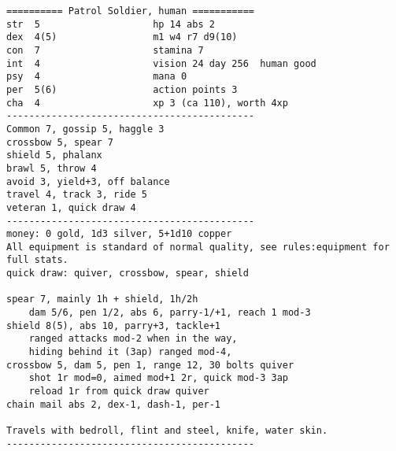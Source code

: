\goodbreak \begin{samepage} \small \begin{verbatim}
========== Patrol Soldier, human ===========
str  5                    hp 14 abs 2
dex  4(5)                 m1 w4 r7 d9(10)
con  7                    stamina 7
int  4                    vision 24 day 256  human good
psy  4                    mana 0
per  5(6)                 action points 3
cha  4                    xp 3 (ca 110), worth 4xp
--------------------------------------------
Common 7, gossip 5, haggle 3
crossbow 5, spear 7
shield 5, phalanx
brawl 5, throw 4
avoid 3, yield+3, off balance
travel 4, track 3, ride 5
veteran 1, quick draw 4
--------------------------------------------
money: 0 gold, 1d3 silver, 5+1d10 copper
All equipment is standard of normal quality, see rules:equipment for full stats.
quick draw: quiver, crossbow, spear, shield

spear 7, mainly 1h + shield, 1h/2h
    dam 5/6, pen 1/2, abs 6, parry-1/+1, reach 1 mod-3
shield 8(5), abs 10, parry+3, tackle+1
    ranged attacks mod-2 when in the way,
    hiding behind it (3ap) ranged mod-4,
crossbow 5, dam 5, pen 1, range 12, 30 bolts quiver
    shot 1r mod=0, aimed mod+1 2r, quick mod-3 3ap
    reload 1r from quick draw quiver
chain mail abs 2, dex-1, dash-1, per-1

Travels with bedroll, flint and steel, knife, water skin.
--------------------------------------------
\end{verbatim} \normalsize \end{samepage}

\











\clearpage
{}






